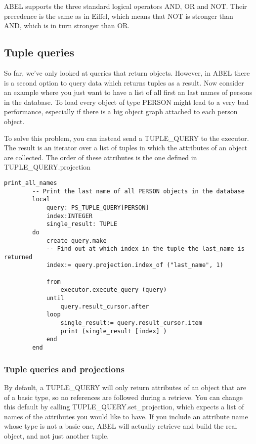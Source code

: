 ABEL supports the three standard logical operators AND, OR and NOT. Their precedence is the same as in Eiffel, which means that NOT is stronger than AND, which is in turn stronger than OR.



\subsection{Tuple queries}

So far, we've only looked at queries that return objects. However, in ABEL there is a second option to query data which returns tuples as a result.
Now consider an example where you just want to have a list of all first an last names of persons in the database. 
To load every object of type PERSON might lead to a very bad performance, especially if there is a big object graph attached to each person object.

To solve this problem, you can instead send a TUPLE\_QUERY to the executor. 
The result is an iterator over a list of tuples in which the attributes of an object are collected. The order of these attributes is the one defined in TUPLE\_QUERY.projection

\begin{lstlisting}[language=OOSC2Eiffel, captionpos=b, caption={}, label={lst:tuple_query_simple}]
	print_all_names
		-- Print the last name of all PERSON objects in the database
		local
			query: PS_TUPLE_QUERY[PERSON]
			index:INTEGER
			single_result: TUPLE
		do
			create query.make
			-- Find out at which index in the tuple the last_name is returned
			index:= query.projection.index_of ("last_name", 1)

			from
				executor.execute_query (query)
			until
				query.result_cursor.after
			loop
				single_result:= query.result_cursor.item
				print (single_result [index] )
			end			
		end
\end{lstlisting}
\subsubsection{Tuple queries and projections}
By default, a TUPLE\_QUERY will only return attributes of an object that are of a basic type, so no references are followed during a retrieve.
You can change this default by calling TUPLE\_QUERY.set\_projection, which expects a list of names of the attributes you would like to have.
If you include an attribute name whose type is not a basic one, ABEL will actually retrieve and build the real object, and not just another tuple.

